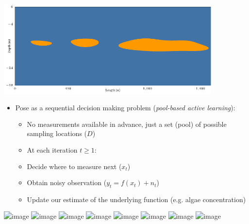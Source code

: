 \documentclass[10pt]{beamer}
\begin{document}
\begin{frame}
\begin{center}
\vspace{0.2in}
\hspace{-2em}\includegraphics[width=4.45in]{figures/limno_bgape_cl}
\end{center}
\end{frame}

\begin{frame}
\begin{itemize}
\item<1-> Pose as a sequential decision making problem (\emph{pool-based active learning}):
\begin{itemize}
\item<2-> No measurements available in advance, just a set (pool) of possible sampling locations ($D$)
\vspace{0.5em}
\item<3->[]\hspace{-1.5em} At each iteration $t \geq 1$:
\item<3-> Decide where to measure next ($x_t$)
\item<4-> Obtain noisy observation ($y_t = f(x_t) + n_t$)
\item<5-> Update our estimate of the underlying function (e.g. algae concentration)
\end{itemize}
\end{itemize}
\begin{center}
\color{white}
\includegraphics<1>[draft,width=4.45in]{figures/oned_0}
\color{black}
\includegraphics<2>[width=4.45in]{figures/oned_0}
\includegraphics<3>[width=4.45in]{figures/oned_1_0}
\includegraphics<4>[width=4.45in]{figures/oned_1_1}
\includegraphics<5>[width=4.45in]{figures/oned_1_2}
\includegraphics<6>[width=4.45in]{figures/oned_2_0}
\includegraphics<7>[width=4.45in]{figures/oned_2_1}
\includegraphics<8>[width=4.45in]{figures/oned_2_2}
\end{center}
\end{frame}
\end{document}
